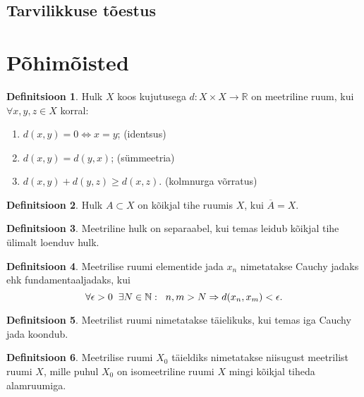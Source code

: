 \documentclass{article}[12pt]
\newcommand{\h}{\hspace{0.2cm}}
\newcommand{\R}{\mathbb{R}}
\newcommand{\N}{\mathbb{N}}
\theoremstyle{definition}
\newtheorem{definition}{Definitsioon}[section]
\theoremstyle{definition}
\theoremstyle{definition}
\theoremstyle{break}
\begin{document}
\subsection{Tarvilikkuse tõestus}

\section{Põhimõisted}

\begin{definition}
	Hulk $X$ koos kujutusega $d:X\times X\rightarrow \R$ on meetriline ruum, kui $\forall x,y,z\in X$ korral:
	\begin{enumerate}
		\item $d(x,y)=0 \Leftrightarrow x=y$; \hfill (identsus)
		\item $d(x,y) = d(y,x)$; \hfill (sümmeetria)
		\item $d(x,y) + d(y,z) \geq d(x,z)$. \hfill (kolmnurga võrratus)
	\end{enumerate}
\end{definition}

\begin{definition}
	Hulk $A\subset X$ on kõikjal tihe ruumis $X$, kui $\overline{A} = X$.
\end{definition}

\begin{definition}
	Meetriline hulk on separaabel, kui temas leidub kõikjal tihe ülimalt loenduv hulk.
\end{definition}

\begin{definition}
	Meetrilise ruumi elementide jada $x_n$ nimetatakse Cauchy jadaks ehk fundamentaaljadaks, kui
	\[
		\forall \epsilon > 0\h\exists N\in\N:\h n,m>N\Rightarrow d(x_n,x_m)<\epsilon.
	\]
\end{definition}

\begin{definition}
	Meetrilist ruumi nimetatakse täielikuks, kui temas iga Cauchy jada koondub.
\end{definition}

\begin{definition}
	Meetrilise ruumi $X_0$ täieldiks nimetatakse niisugust meetrilist ruumi $X$, mille puhul $X_0$ on isomeetriline ruumi $X$ mingi kõikjal tiheda alamruumiga.
\end{definition}
\end{document}
